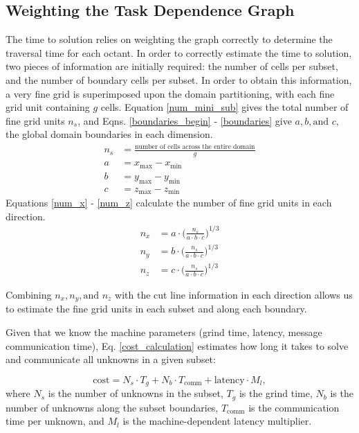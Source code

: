 \documentclass[11pt, letterpaper,titlepage,oneside]{article}
\begin{document}
\subsection{Weighting the Task Dependence Graph}\label{weighting_graphs}

The time to solution relies on weighting the graph correctly to determine the traversal time for each octant. In order to correctly estimate the time to solution, two pieces of information are initially required: the number of cells per subset, and the number of boundary cells per subset. In order to obtain this information, a very fine grid is superimposed upon the domain partitioning, with each fine grid unit containing $g$ cells. Equation \eqref{num_mini_sub} gives the total number of fine grid units $n_s$, and Eqns. \eqref{boundaries_begin} - \eqref{boundaries} give $a,b, \text{and }  c$, the global domain boundaries in each dimension. 
\begin{align}
\label{num_mini_sub}
n_s &= \frac{\text{number of cells across the entire domain}}{g} \\
\label{boundaries_begin}
a &= x_{\text{max}} - x_{\text{min}} \\
b &= y_{\text{max}} - y_{\text{min}} \\
c &= z_{\text{max}} - z_{\text{min}} 
\label{boundaries}
\end{align}
Equations \eqref{num_x} - \eqref{num_z} calculate the number of fine grid units in each direction.
\begin{align}
\label{num_x}
n_{x} &= a \cdot \Big(\frac{n_s}{a\cdot b \cdot c}\Big)^{1/3} \\
n_{y} &= b \cdot \Big(\frac{n_s}{a\cdot b \cdot c}\Big)^{1/3} \\
n_{z} &= c \cdot \Big(\frac{n_s}{a\cdot b \cdot c}\Big)^{1/3} 
\label{num_z}
\end{align}

Combining $n_x, n_y, \text{and } n_z$ with the cut line information in each direction allows us to estimate the fine grid units in each subset and along each boundary.  

Given that we know the machine parameters (grind time, latency, message communication time), Eq. \ref{cost_calculation} estimates how long it takes to solve and communicate all unknowns in a given subset:

\begin{equation}
\text{cost} = N_s\cdot T_g + N_b\cdot T_{\text{comm}} + \text{latency}\cdot M_l,
\label{cost_calculation}
\end{equation}
where $N_s$ is the number of unknowns in the subset, $T_g$ is the grind time, $N_b$ is the number of unknowns along the subset boundaries, $T_\text{comm}$ is the communication time per unknown, and $M_l$ is the machine-dependent latency multiplier. 
\end{document}
